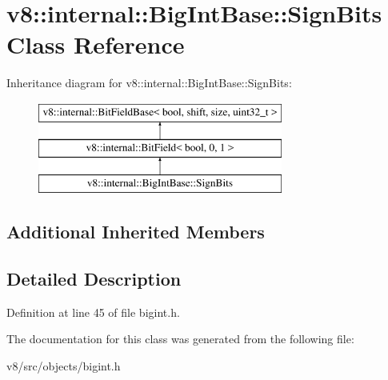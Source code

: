 \hypertarget{classv8_1_1internal_1_1BigIntBase_1_1SignBits}{}\section{v8\+:\+:internal\+:\+:Big\+Int\+Base\+:\+:Sign\+Bits Class Reference}
\label{classv8_1_1internal_1_1BigIntBase_1_1SignBits}
Inheritance diagram for v8\+:\+:internal\+:\+:Big\+Int\+Base\+:\+:Sign\+Bits\+:\begin{figure}[H]
\begin{center}
\leavevmode
\includegraphics[height=3.000000cm]{classv8_1_1internal_1_1BigIntBase_1_1SignBits}
\end{center}
\end{figure}
\subsection*{Additional Inherited Members}


\subsection{Detailed Description}


Definition at line 45 of file bigint.\+h.



The documentation for this class was generated from the following file\+:\begin{DoxyCompactItemize}
\item 
v8/src/objects/bigint.\+h\end{DoxyCompactItemize}
